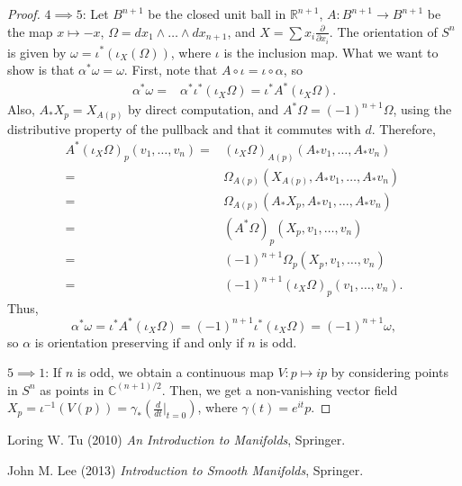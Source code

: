 \documentclass[]{article}
\theoremstyle{definition}
\theoremstyle{definition}
\begin{document}
\begin{proof}
    $4\implies 5$: Let $B^{n+1}$ be the closed unit ball in $\mathbb{R}^{n+1}$, $A:B^{n+1} \rightarrow B^{n+1}$ be the map $x \mapsto -x$, $\Omega=dx_1\wedge\dots\wedge dx_{n+1}$, and $X=\sum x_i\frac{\partial}{\partial x_i}$. The orientation of $S^n$ is given by $\omega=\iota^*(\iota_X(\Omega))$, where $\iota$ is the inclusion map. What we want to show is that $\alpha^*\omega=\omega$. First, note that $A\circ \iota=\iota\circ\alpha$, so 
    \begin{align*}
        \alpha^*\omega=&\alpha^*\iota^*(\iota_X\Omega)
        =\iota^*A^*(\iota_X\Omega).
    \end{align*}
    Also, $A_*X_{p}=X_{A(p)}$ by direct computation, and $A^*\Omega=(-1)^{n+1}\Omega$, using the distributive property of the pullback and that it commutes with $d$. Therefore, \begin{align*}
        A^*(\iota_X\Omega)_p(v_1, \dots, v_n)=&(\iota_X\Omega)_{A(p)}(A_*v_1, \dots, A_*v_n)\\
        =&\Omega_{A(p)}(X_{A(p)}, A_*v_1, \dots, A_*v_n)\\
        =&\Omega_{A(p)}(A_*X_p, A_*v_1, \dots, A_*v_n)\\
        =&(A^*\Omega)_p(X_p, v_1, \dots, v_n)\\
        =&(-1)^{n+1}\Omega_p(X_p, v_1, \dots, v_n)\\
        =&(-1)^{n+1}(\iota_X\Omega)_p(v_1, \dots, v_n).
    \end{align*}
    Thus, \[\alpha^*\omega=\iota^*A^*(\iota_X\Omega)=(-1)^{n+1}\iota^*(\iota_X\Omega)=(-1)^{n+1}\omega,\]
    so $\alpha$ is orientation preserving if and only if $n$ is odd.
    
    $5\implies 1$: If $n$ is odd, we obtain a continuous map $V:p\mapsto ip$ by considering points in $S^n$ as points in $\mathbb{C}^{(n+1)/2}$. Then, we get a non-vanishing vector field $X_p=\iota^{-1}(V(p))=\gamma_*(\frac{d}{dt}|_{t=0})$, where $\gamma(t)=e^{it}p$.

\end{proof}

\begin{thebibliography}{9}
    Loring W. Tu (2010) \emph{An Introduction to Manifolds}, Springer.
    
    John M. Lee (2013) \emph{Introduction to Smooth Manifolds}, Springer.
\end{thebibliography}
\end{document}
